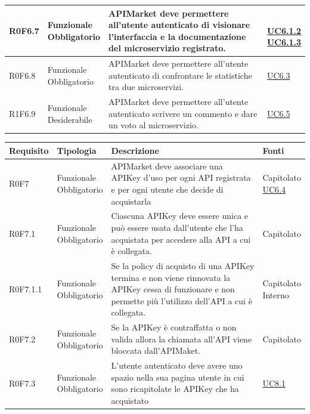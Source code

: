 \documentclass[12pt,a4paper,titlepage]{article}
\newcommand{\minitab}[2][1]{\begin{tabular}#1 #2\end{tabular}}
\newcommand{\uc}[1]{\hyperref[UC#1]{UC#1}}
\begin{document}
{\begin{longtable}{|m{5em}|m{6em}|m{28em}|m{5em}|}
			\hline
			R0F6.7 & \minitab[c]{Funzionale\\Obbligatorio} & APIMarket deve permettere all'utente autenticato di visionare l'interfaccia e la documentazione del microservizio registrato. & \shortstack[l]{\\\uc{6.1.2}\\\uc{6.1.3}}\\
			\hline
			R0F6.8 & \minitab[c]{Funzionale\\Obbligatorio} & APIMarket deve permettere all'utente autenticato di confrontare le statistiche tra due microservizi. & \uc{6.3}\\
			\hline
			R1F6.9 & \minitab[c]{Funzionale\\Desiderabile} & APIMarket deve permettere all'utente autenticato scrivere un commento e dare un voto al microservizio. & \uc{6.5}\\
			\hline
		\end{longtable}
		\begin{longtable}{|m{5em}|m{6em}|m{28em}|m{5em}|}
			\hline
			\textbf{Requisito} & \textbf{Tipologia}  & \textbf{Descrizione} & \textbf{Fonti} \\
			\hline
			R0F7 & \minitab[c]{Funzionale\\Obbligatorio} & APIMarket deve associare una APIKey d'uso per ogni API registrata e per ogni utente che decide di acquistarla & \shortstack[l]{Capitolato\\\uc{6.4}}\\
			\hline
			R0F7.1 & \minitab[c]{Funzionale\\Obbligatorio} & Ciascuna APIKey deve essere unica e può essere usata dall'utente che l'ha acquistata per accedere alla API a cui è collegata. & Capitolato\\
			\hline
			R0F7.1.1 & \minitab[c]{Funzionale\\Obbligatorio} & Se la policy di acquisto di una APIKey termina e non viene rinnovata la APIKey cessa di funzionare e non permette più l'utilizzo dell'API a cui è collegata. & \shortstack[l]{Capitolato \\ Interno}\\
			\hline
			R0F7.2 & \minitab[c]{Funzionale\\Obbligatorio} & Se la APIKey è contraffatta o non valida allora la chiamata all'API viene bloccata dall'APIMaket. & Capitolato\\
			\hline
			R0F7.3 & \minitab[c]{Funzionale\\Obbligatorio} & L'utente autenticato deve avere uno spazio nella sua pagina utente in cui sono ricapitolate le APIKey che ha acquistato & \uc{8.1}\\

\end{longtable}}
\end{document}

